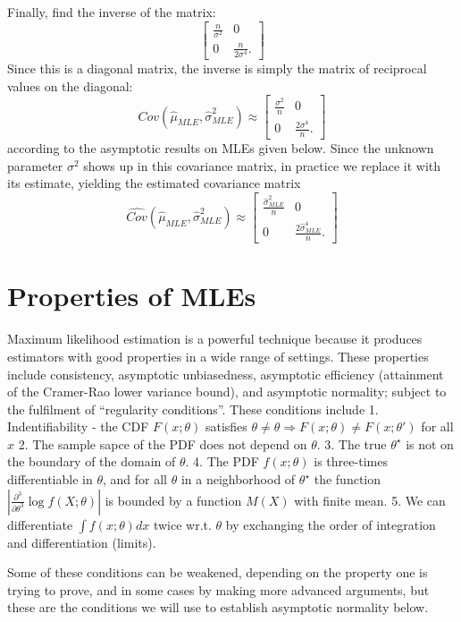 \documentclass[
]{book}
\begin{document}
Finally, find the inverse of the matrix:
\[\begin{bmatrix}
\frac{n}{\sigma^2} &0 \\
0 &\frac{n}{2\sigma^4}.
\end{bmatrix}\]
Since this is a diagonal matrix, the inverse is simply the matrix of reciprocal values on the diagonal:
\[Cov(\hat\mu_{MLE}, \hat\sigma^2_{MLE}) \approx \begin{bmatrix}
\frac{\sigma^2}{n} &0 \\
0 &\frac{2\sigma^4}{n}.
\end{bmatrix}\]
according to the asymptotic results on MLEs given below. Since the unknown parameter \(\sigma^2\) shows up in this covariance matrix, in practice we replace it with its estimate, yielding the estimated covariance matrix
\[\widehat {Cov}(\hat\mu_{MLE}, \hat\sigma^2_{MLE}) \approx \begin{bmatrix}
\frac{\hat\sigma_{MLE}^2}{n} &0 \\
0 &\frac{2\hat\sigma_{MLE}^4}{n}.
\end{bmatrix}\]

\hypertarget{properties-of-mles}{%
\section{Properties of MLEs}\label{properties-of-mles}}

Maximum likelihood estimation is a powerful technique because it produces estimators with good properties in a wide range of settings. These properties include consistency, asymptotic unbiasedness, asymptotic efficiency (attainment of the Cramer-Rao lower variance bound), and asymptotic normality; subject to the fulfilment of ``regularity conditions''. These conditions include
1. Indentifiability - the CDF \(F(x; \theta)\) satisfies \(\theta\ne\theta\Rightarrow F(x;\theta)\ne F(x;\theta')\) for all \(x\)
2. The sample sapce of the PDF does not depend on \(\theta\).
3. The true \(\theta^\star\) is not on the boundary of the domain of \(\theta\).
4. The PDF \(f(x;\theta)\) is three-times differentiable in \(\theta\), and for all \(\theta\) in a neighborhood of \(\theta^\star\) the function \(|\frac{\partial^3}{\partial\theta^3}\log f(X;\theta)|\) is bounded by a function \(M(X)\) with finite mean.
5. We can differentiate \(\int f(x;\theta)dx\) twice wr.t. \(\theta\) by exchanging the order of integration and differentiation (limits).

Some of these conditions can be weakened, depending on the property one is trying to prove, and in some cases by making more advanced arguments, but these are the conditions we will use to establish asymptotic normality below.
\end{document}
